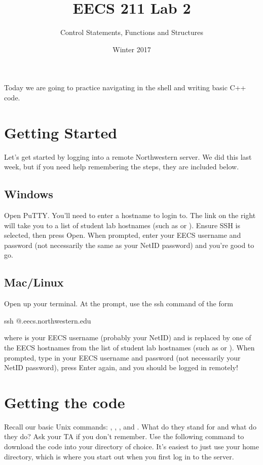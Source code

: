 \documentclass{tufte-handout}
\title{EECS 211 Lab 2}
\author{Control Statements, Functions and Structures}
\date{Winter 2017}
\begin{document}
\maketitle

Today we are going to practice navigating in the shell and writing basic C++ code. 

\section{Getting Started}
Let's get started by logging into a remote Northwestern server. We did this last week, but if you need help remembering the steps, they are included below. 

\subsection{Windows}
Open PuTTY. You'll need to enter a hostname to login to. The link on the right will take you to a list of student lab hostnames (such as   or ).  Ensure SSH is selected, then press Open. When prompted, enter your EECS username and password (not necessarily the same as your NetID password) and you're good to go.

\subsection{Mac/Linux}
Open up your terminal. At the prompt, use the ssh command of the form
\begin{CmdLine}
  \prompt ssh @.eecs.northwestern.edu
\end{CmdLine}
\noindent where  is your EECS username (probably your NetID)
and  is replaced by one of the EECS hostnames from the list
of student lab hostnames (such as  or
).
When prompted, type in your EECS username and password (not necessarily your NetID password), press
Enter again, and you should be logged in remotely!

\section{Getting the code}
Recall our basic Unix commands: , , , and . What do they stand for and what do they do? Ask your TA if you don't remember.  
Use the following  command to download the code into your directory of choice. It's easiest to just use your home directory, which is where you start out when you first log in to the server.
\end{document}
